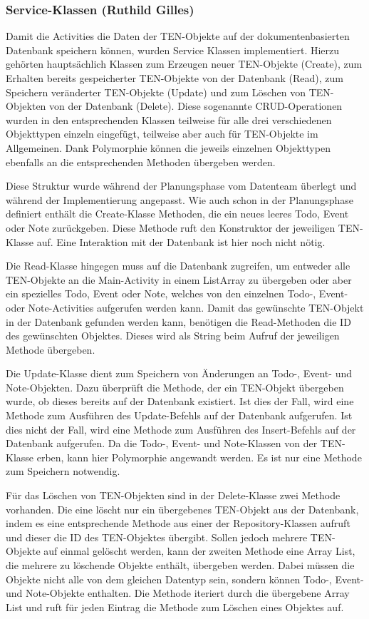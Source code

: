 \subsubsection{Service-Klassen (Ruthild Gilles)}

Damit die Activities die Daten der TEN-Objekte auf der dokumentenbasierten Datenbank speichern können, wurden Service Klassen implementiert. Hierzu gehörten hauptsächlich Klassen zum Erzeugen neuer TEN-Objekte (Create), zum Erhalten bereits gespeicherter TEN-Objekte von der Datenbank (Read), zum Speichern veränderter TEN-Objekte (Update) und zum Löschen von TEN-Objekten von der Datenbank (Delete). Diese sogenannte CRUD-Operationen wurden in den entsprechenden Klassen teilweise für alle drei verschiedenen Objekttypen einzeln eingefügt, teilweise aber auch für TEN-Objekte im Allgemeinen. Dank Polymorphie können die jeweils einzelnen Objekttypen ebenfalls an die entsprechenden Methoden übergeben werden.

Diese Struktur wurde während der Planungsphase vom Datenteam überlegt und während der Implementierung angepasst. Wie auch schon in der Planungsphase definiert enthält die Create-Klasse Methoden, die ein neues leeres Todo, Event oder Note zurückgeben. Diese Methode ruft den Konstruktor der jeweiligen TEN-Klasse auf. Eine Interaktion mit der Datenbank ist hier noch nicht nötig.

Die Read-Klasse hingegen muss auf die Datenbank zugreifen, um entweder alle TEN-Objekte an die Main-Activity in einem ListArray zu übergeben oder aber ein spezielles Todo, Event oder Note, welches von den einzelnen Todo-, Event- oder Note-Activities aufgerufen werden kann. Damit das gewünschte TEN-Objekt in der Datenbank gefunden werden kann, benötigen die Read-Methoden die ID des gewünschten Objektes. Dieses wird als String beim Aufruf der jeweiligen Methode übergeben.

Die Update-Klasse dient zum Speichern von Änderungen an Todo-, Event- und Note-Objekten. Dazu überprüft die Methode, der ein TEN-Objekt übergeben wurde, ob dieses bereits auf der Datenbank existiert. Ist dies der Fall, wird eine Methode zum Ausführen des Update-Befehls auf der Datenbank aufgerufen. Ist dies nicht der Fall, wird eine Methode zum Ausführen des Insert-Befehls auf der Datenbank aufgerufen. Da die Todo-, Event- und Note-Klassen von der TEN-Klasse erben, kann hier Polymorphie angewandt werden. Es ist nur eine Methode zum Speichern notwendig.

Für das Löschen von TEN-Objekten sind in der Delete-Klasse zwei Methode vorhanden. Die eine löscht nur ein übergebenes TEN-Objekt aus der Datenbank, indem es eine entsprechende Methode aus einer der Repository-Klassen aufruft und dieser die ID des TEN-Objektes übergibt. Sollen jedoch mehrere TEN-Objekte auf einmal gelöscht werden, kann der zweiten Methode eine Array List, die mehrere zu löschende Objekte enthält, übergeben werden. Dabei müssen die Objekte nicht alle von dem gleichen Datentyp sein, sondern können Todo-, Event- und Note-Objekte enthalten. Die Methode iteriert durch die übergebene Array List und ruft für jeden Eintrag die Methode zum Löschen eines Objektes auf.

